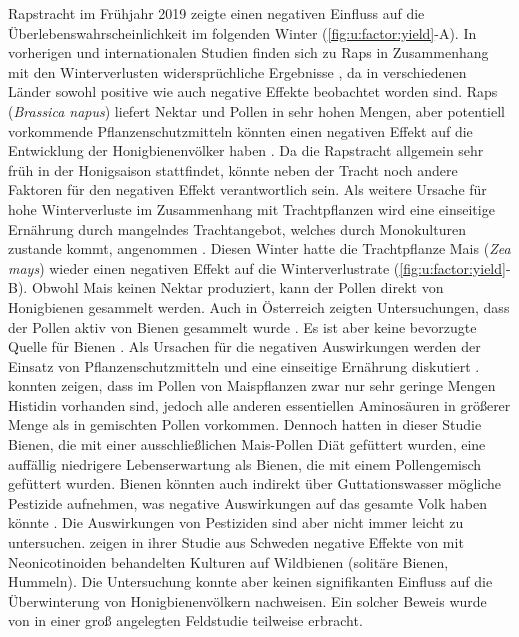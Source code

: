 Rapstracht im Frühjahr 2019 zeigte einen negativen Einfluss auf die Überlebenswahrscheinlichkeit im folgenden Winter (\cref{fig:u:factor:yield}-A). In vorherigen und internationalen Studien finden sich zu Raps in Zusammenhang mit den Winterverlusten widersprüchliche Ergebnisse \citep{vanderzee2014, gray2019, oberreiter2020}, da in verschiedenen Länder sowohl positive wie auch negative Effekte beobachtet worden sind. Raps (\textit{Brassica napus}) liefert Nektar und Pollen in sehr hohen Mengen, aber potentiell vorkommende Pflanzenschutzmitteln könnten einen negativen Effekt auf die Entwicklung der Honigbienenvölker haben \citep{rundlof2015, goulson2015, rolke2016}. Da die Rapstracht allgemein sehr früh in der Honigsaison stattfindet, könnte neben der Tracht noch andere Faktoren für den negativen Effekt verantwortlich sein. Als weitere Ursache für hohe Winterverluste im Zusammenhang mit Trachtpflanzen wird eine einseitige Ernährung durch mangelndes Trachtangebot, welches durch Monokulturen zustande kommt, angenommen \citep{brodschneider2013, requieretal2017}. 
\newline
Diesen Winter hatte die Trachtpflanze Mais (\textit{Zea mays}) wieder einen negativen Effekt auf die Winterverlustrate (\cref{fig:u:factor:yield}-B). Obwohl Mais keinen Nektar produziert, kann der Pollen direkt von Honigbienen gesammelt werden. Auch in Österreich zeigten Untersuchungen, dass der Pollen aktiv von Bienen gesammelt wurde \citep{brodschneider2019a}. Es ist aber keine bevorzugte Quelle für Bienen \citep{hocherl2012, urbanowicz2019}. Als Ursachen für die negativen Auswirkungen werden der Einsatz von Pflanzenschutzmitteln und eine einseitige Ernährung diskutiert \citep{brodschneider2013, vanderzee2014, dipasquale2016}. \cite{hocherl2012} konnten zeigen, dass im Pollen von Maispflanzen zwar nur sehr geringe Mengen Histidin vorhanden sind, jedoch alle anderen essentiellen Aminosäuren in größerer Menge als in gemischten Pollen vorkommen. Dennoch hatten in dieser Studie Bienen, die mit einer ausschließlichen Mais-Pollen Diät gefüttert wurden, eine auffällig niedrigere Lebenserwartung als Bienen, die mit einem Pollengemisch gefüttert wurden. Bienen könnten auch indirekt über Guttationswasser mögliche Pestizide aufnehmen, was negative Auswirkungen auf das gesamte Volk haben könnte \citep{schmolke2018}. Die Auswirkungen von Pestiziden sind aber nicht immer leicht zu untersuchen. \cite{rundlof2015} zeigen in ihrer Studie aus Schweden negative Effekte von mit Neonicotinoiden behandelten Kulturen auf Wildbienen (solitäre Bienen, Hummeln). Die Untersuchung konnte aber keinen signifikanten Einfluss auf die Überwinterung von Honigbienenvölkern nachweisen. Ein solcher Beweis wurde von \cite{woodcock2017} in einer groß angelegten Feldstudie teilweise erbracht. 
